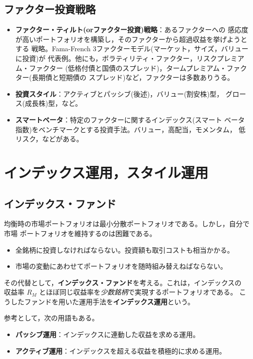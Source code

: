 \subsection{ファクター投資戦略}

\begin{itemize}
\item \textbf{ファクター・ティルト(orファクター投資)戦略}：あるファクターへの
感応度が高いポートフォリオを構築し，そのファクターから超過収益を挙げようとする
戦略。Fama-French 3ファクターモデル(マーケット，サイズ，バリューに投資)が
代表例。他にも，ボラティリティ・ファクター，リスクプレミアム・ファクター
(低格付債と国債のスプレッド)，タームプレミアム・ファクター(長期債と短期債の
スプレッド)など，ファクターは多数ありうる。
\item \textbf{投資スタイル}：アクティブとパッシブ(後述)，バリュー(割安株)型，
グロース(成長株)型，など。
\item \textbf{スマートベータ}：特定のファクターに関するインデックス(スマート
ベータ指数)をベンチマークとする投資手法。バリュー，高配当，モメンタム，
低リスク，などがある。
\end{itemize}

\section{インデックス運用，スタイル運用}

\subsection{インデックス・ファンド}

均衡時の市場ポートフォリオは最小分散ポートフォリオである。しかし，自分で市場
ポートフォリオを維持するのは困難である。
\begin{itemize}
\item 全銘柄に投資しなければならない。投資額も取引コストも相当かかる。
\item 市場の変動にあわせてポートフォリオを随時組み替えねばならない。
\end{itemize}

その代替として，\textbf{インデックス・ファンド}を考える。これは，インデックスの
収益率 $R_M$ とほぼ同じ収益率を\emph{少数銘柄}で実現するポートフォリオである。
こうしたファンドを用いた運用手法を\textbf{インデックス運用}という。

参考として，次の用語もある。
\begin{itemize}
\item \textbf{パッシブ運用}：インデックスに連動した収益を求める運用。
\item \textbf{アクティブ運用}：インデックスを超える収益を積極的に求める運用。
\end{itemize}

